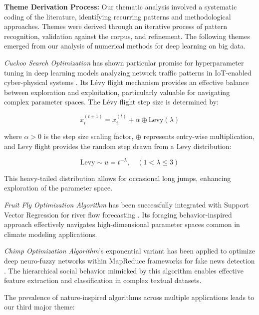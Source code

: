 \textbf{Theme Derivation Process:} Our thematic analysis involved a systematic coding of the literature, identifying recurring patterns and methodological approaches. Themes were derived through an iterative process of pattern recognition, validation against the corpus, and refinement. The following themes emerged from our analysis of numerical methods for deep learning on big data.

\textit{Cuckoo Search Optimization} has shown particular promise for hyperparameter tuning in deep learning models analyzing network traffic patterns in IoT-enabled cyber-physical systems \citep{Sagu202535}. Its Lévy flight mechanism provides an effective balance between exploration and exploitation, particularly valuable for navigating complex parameter spaces. The Lévy flight step size is determined by:

\begin{equation}
x_i^{(t+1)} = x_i^{(t)} + \alpha \oplus \textrm{Levy}(\lambda)
\end{equation}

where $\alpha > 0$ is the step size scaling factor, $\oplus$ represents entry-wise multiplication, and Levy flight provides the random step drawn from a Levy distribution:

\begin{equation}
\textrm{Levy} \sim u = t^{-\lambda}, \quad (1 < \lambda \leq 3)
\end{equation}

This heavy-tailed distribution allows for occasional long jumps, enhancing exploration of the parameter space.

\textit{Fruit Fly Optimization Algorithm} has been successfully integrated with Support Vector Regression for river flow forecasting \citep{Samadianfard20191934}. Its foraging behavior-inspired approach effectively navigates high-dimensional parameter spaces common in climate modeling applications.

\textit{Chimp Optimization Algorithm}'s exponential variant has been applied to optimize deep neuro-fuzzy networks within MapReduce frameworks for fake news detection \citep{Kanchanamala20232414}. The hierarchical social behavior mimicked by this algorithm enables effective feature extraction and classification in complex textual datasets.

The prevalence of nature-inspired algorithms across multiple applications leads to our third major theme:

